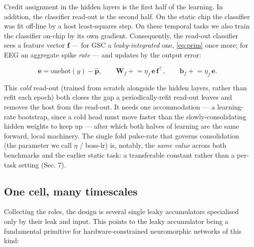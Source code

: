 \documentclass[11pt]{article}
\begin{document}
Credit assignment in the hidden layers is the first half of the
learning. In addition, the classifier read-out is the second half. On
the static chip the classifier was fit off-line by a host least-squares
step. On these temporal tasks we also train the classifier on-chip by
its own gradient. Consequently, the read-out classifier sees a feature
vector \(\bm f\) --- for GSC a \emph{leaky-integrated} one,
\eqref{eq:prim} once more; for EEG an aggregate spike \emph{rate} ---
and updates by the output error:

\begin{equation}
\bm e = \mathrm{onehot}(y) - \hat{\bm p}, \qquad
\bm W_f \mathrel{+}= \eta_f\, \bm e\, \bm f^{\!\top}, \qquad
\bm b_f \mathrel{+}= \eta_f\, \bm e .
\label{eq:readout}
\end{equation}

This \emph{cold} read-out (trained from scratch alongside the hidden
layers, rather than refit each epoch) both closes the gap a
periodically-refit read-out leaves and removes the host from the
read-out. It needs one accommodation --- a learning-rate bootstrap,
since a cold head must move faster than the slowly-consolidating hidden
weights to keep up --- after which both halves of learning are the same
forward, local machinery. The single fold pulse-rate that governs
consolidation (the parameter we call \(\eta\) / boss-lr) is, notably,
the \emph{same value} across both benchmarks and the earlier static
task: a transferable constant rather than a per-task setting (Sec. 7).

\hypertarget{sec:timescales}{%
\subsection{One cell, many timescales}\label{sec:timescales}}

Collecting the roles, the design is several single leaky accumulators
specialised only by their leak and input. This points to the leaky
accumulator being a fundamental primitive for hardware-constrained
neuromorphic networks of this kind:
\end{document}
